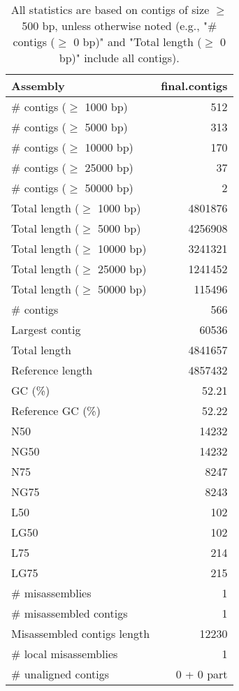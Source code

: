 \documentclass[12pt,a4paper]{article}
\begin{document}
\begin{table}[ht]
\begin{center}
\caption{All statistics are based on contigs of size $\geq$ 500 bp, unless otherwise noted (e.g., "\# contigs ($\geq$ 0 bp)" and "Total length ($\geq$ 0 bp)" include all contigs).}
\begin{tabular}{|l*{1}{|r}|}
\hline
Assembly & final.contigs \\ \hline
\# contigs ($\geq$ 1000 bp) & 512 \\ \hline
\# contigs ($\geq$ 5000 bp) & 313 \\ \hline
\# contigs ($\geq$ 10000 bp) & 170 \\ \hline
\# contigs ($\geq$ 25000 bp) & 37 \\ \hline
\# contigs ($\geq$ 50000 bp) & 2 \\ \hline
Total length ($\geq$ 1000 bp) & 4801876 \\ \hline
Total length ($\geq$ 5000 bp) & 4256908 \\ \hline
Total length ($\geq$ 10000 bp) & 3241321 \\ \hline
Total length ($\geq$ 25000 bp) & 1241452 \\ \hline
Total length ($\geq$ 50000 bp) & 115496 \\ \hline
\# contigs & 566 \\ \hline
Largest contig & 60536 \\ \hline
Total length & 4841657 \\ \hline
Reference length & 4857432 \\ \hline
GC (\%) & 52.21 \\ \hline
Reference GC (\%) & 52.22 \\ \hline
N50 & 14232 \\ \hline
NG50 & 14232 \\ \hline
N75 & 8247 \\ \hline
NG75 & 8243 \\ \hline
L50 & 102 \\ \hline
LG50 & 102 \\ \hline
L75 & 214 \\ \hline
LG75 & 215 \\ \hline
\# misassemblies & 1 \\ \hline
\# misassembled contigs & 1 \\ \hline
Misassembled contigs length & 12230 \\ \hline
\# local misassemblies & 1 \\ \hline
\# unaligned contigs & 0 + 0 part \\ \hline

\end{tabular}
\end{center}
\end{table}
\end{document}
